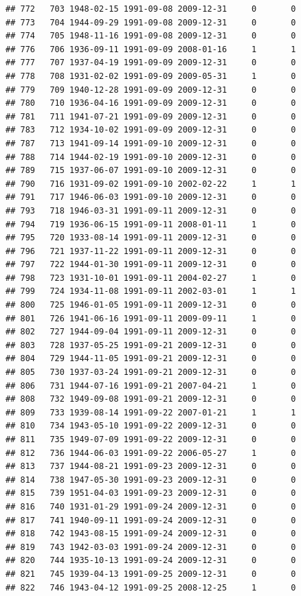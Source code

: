 \documentclass[
]{book}
\theoremstyle{definition}
\theoremstyle{definition}
\theoremstyle{definition}
\theoremstyle{definition}
\theoremstyle{remark}
\begin{document}
\begin{verbatim}
## 772   703 1948-02-15 1991-09-08 2009-12-31     0       0
## 773   704 1944-09-29 1991-09-08 2009-12-31     0       0
## 774   705 1948-11-16 1991-09-08 2009-12-31     0       0
## 776   706 1936-09-11 1991-09-09 2008-01-16     1       1
## 777   707 1937-04-19 1991-09-09 2009-12-31     0       0
## 778   708 1931-02-02 1991-09-09 2009-05-31     1       0
## 779   709 1940-12-28 1991-09-09 2009-12-31     0       0
## 780   710 1936-04-16 1991-09-09 2009-12-31     0       0
## 781   711 1941-07-21 1991-09-09 2009-12-31     0       0
## 783   712 1934-10-02 1991-09-09 2009-12-31     0       0
## 787   713 1941-09-14 1991-09-10 2009-12-31     0       0
## 788   714 1944-02-19 1991-09-10 2009-12-31     0       0
## 789   715 1937-06-07 1991-09-10 2009-12-31     0       0
## 790   716 1931-09-02 1991-09-10 2002-02-22     1       1
## 791   717 1946-06-03 1991-09-10 2009-12-31     0       0
## 793   718 1946-03-31 1991-09-11 2009-12-31     0       0
## 794   719 1936-06-15 1991-09-11 2008-01-11     1       0
## 795   720 1933-08-14 1991-09-11 2009-12-31     0       0
## 796   721 1937-11-22 1991-09-11 2009-12-31     0       0
## 797   722 1944-01-30 1991-09-11 2009-12-31     0       0
## 798   723 1931-10-01 1991-09-11 2004-02-27     1       0
## 799   724 1934-11-08 1991-09-11 2002-03-01     1       1
## 800   725 1946-01-05 1991-09-11 2009-12-31     0       0
## 801   726 1941-06-16 1991-09-11 2009-09-11     1       0
## 802   727 1944-09-04 1991-09-11 2009-12-31     0       0
## 803   728 1937-05-25 1991-09-21 2009-12-31     0       0
## 804   729 1944-11-05 1991-09-21 2009-12-31     0       0
## 805   730 1937-03-24 1991-09-21 2009-12-31     0       0
## 806   731 1944-07-16 1991-09-21 2007-04-21     1       0
## 808   732 1949-09-08 1991-09-21 2009-12-31     0       0
## 809   733 1939-08-14 1991-09-22 2007-01-21     1       1
## 810   734 1943-05-10 1991-09-22 2009-12-31     0       0
## 811   735 1949-07-09 1991-09-22 2009-12-31     0       0
## 812   736 1944-06-03 1991-09-22 2006-05-27     1       0
## 813   737 1944-08-21 1991-09-23 2009-12-31     0       0
## 814   738 1947-05-30 1991-09-23 2009-12-31     0       0
## 815   739 1951-04-03 1991-09-23 2009-12-31     0       0
## 816   740 1931-01-29 1991-09-24 2009-12-31     0       0
## 817   741 1940-09-11 1991-09-24 2009-12-31     0       0
## 818   742 1943-08-15 1991-09-24 2009-12-31     0       0
## 819   743 1942-03-03 1991-09-24 2009-12-31     0       0
## 820   744 1935-10-13 1991-09-24 2009-12-31     0       0
## 821   745 1939-04-13 1991-09-25 2009-12-31     0       0
## 822   746 1943-04-12 1991-09-25 2008-12-25     1       0

\end{verbatim}
\end{document}
